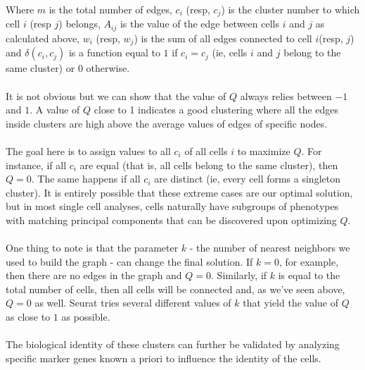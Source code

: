 Where $m$ is the total number of edges, $c_i$ (resp, $c_j$) is the cluster number to which cell $i$ (resp $j$) belongs, $A_{ij}$ is the value of the edge between cells $i$ and $j$ as calculated above, $w_i$ (resp, $w_j$) is the sum of all edges connected to cell $i$(resp, $j$) and $\delta(c_i, c_j)$ is a function equal to $1$ if $c_i = c_j$ (ie, cells $i$ and $j$  belong to the same cluster) or $0$ otherwise.\\
\\ 
It is not obvious but we can show that the value of $Q$ always relies between $-1$ and $1$. A value of $Q$ close to 1 indicates a good clustering where all the edges inside clusters are high above the average values of edges of specific nodes.\\
\\
The goal here is to assign values to all $c_i$ of all cells $i$ to maximize $Q$. For instance, if all $c_i$ are equal (that is, all cells belong to the same cluster), then $Q=0$. The same happens if all $c_i$ are distinct (ie, every cell forms a singleton cluster). It is entirely possible that these extreme cases are our optimal solution, but in most single cell analyses, cells naturally have subgroups of phenotypes with matching principal components that can be discovered upon optimizing $Q$. \\
\\
One thing to note is that the parameter $k$ - the number of nearest neighbors we used to build the graph - can change the final solution. If $k=0$, for example, then there are no edges in the graph and $Q=0$. Similarly, if $k$ is equal to the total number of cells, then all cells will be connected and, as we've seen above, $Q=0$ as well. Seurat tries several different values of $k$ that yield the value of $Q$ as close to $1$ as possible. \\
\\
The biological identity of these clusters can further be validated by analyzing specific marker genes known a priori to influence the identity of the cells.


\newpage
